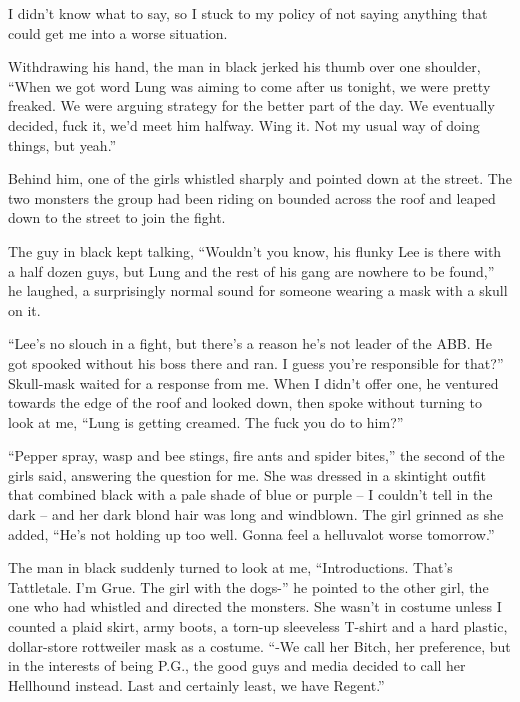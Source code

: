 I didn't know what to say, so I stuck to my policy of not saying anything that could get me into a worse situation.



Withdrawing his hand, the man in black jerked his thumb over one shoulder, ``When we got word Lung was aiming to come after us tonight, we were pretty freaked.  We were arguing strategy for the better part of the day.  We eventually decided, fuck it, we'd meet him halfway.  Wing it.  Not my usual way of doing things, but yeah.''



Behind him, one of the girls whistled sharply and pointed down at the street.  The two monsters the group had been riding on bounded across the roof and leaped down to the street to join the fight.



The guy in black kept talking, ``Wouldn't you know, his flunky Lee is there with a half dozen guys, but Lung and the rest of his gang are nowhere to be found,'' he laughed, a surprisingly normal sound for someone wearing a mask with a skull on it.



``Lee's no slouch in a fight, but there's a reason he's not leader of the ABB.  He got spooked without his boss there and ran.  I guess you're responsible for that?''  Skull-mask waited for a response from me.  When I didn't offer one, he ventured towards the edge of the roof and looked down, then spoke without turning to look at me, ``Lung is getting creamed.  The fuck you do to him?''



``Pepper spray, wasp and bee stings, fire ants and spider bites,'' the second of the girls said, answering the question for me.  She was dressed in a skintight outfit that combined black with a pale shade of blue or purple – I couldn't tell in the dark – and her dark blond hair was long and windblown.  The girl grinned as she added, ``He's not holding up too well.  Gonna feel a helluvalot worse tomorrow.''



The man in black suddenly turned to look at me, ``Introductions.  That's Tattletale.  I'm Grue.  The girl with the dogs-'' he pointed to the other girl, the one who had whistled and directed the monsters.  She wasn't in costume unless I counted a plaid skirt, army boots, a torn-up sleeveless T-shirt and a hard plastic, dollar-store rottweiler mask as a costume. ``-We call her Bitch, her preference, but in the interests of being P.G., the good guys and media decided to call her Hellhound instead.  Last and certainly least, we have Regent.''



